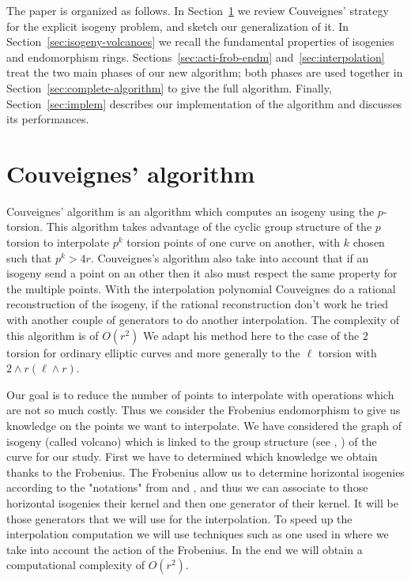\documentclass{lms}
\begin{document}
The paper is organized as follows. In Section~\ref{sec:couv-algor} we
review Couveignes' strategy for the explicit isogeny problem, and
sketch our generalization of it. In
Section~\ref{sec:isogeny-volcanoes} we recall the fundamental
properties of isogenies and endomorphism
rings. Sections~\ref{sec:acti-frob-endm} and~\ref{sec:interpolation}
treat the two main phases of our new algorithm; both phases are used
together in Section~\ref{sec:complete-algorithm} to give the full
algorithm. Finally, Section~\ref{sec:implem} describes our
implementation of the algorithm and discusses its performances.



\section{Couveignes' algorithm}
\label{sec:couv-algor}


Couveignes' algorithm \cite{couveignes96} is an algorithm which computes an isogeny using the $p$-torsion. This algorithm takes advantage of the cyclic group structure of the $p$ torsion to interpolate $p^k$ torsion points of one curve on another, with $k$ chosen such that $p^k>4r$. Couveignes's algorithm also take into account that if an isogeny send a point on an other then it also must respect the same property for the multiple points. With the interpolation polynomial Couveignes do a rational reconstruction of the isogeny, if the rational reconstruction don't work he tried with another couple of generators to do another interpolation. The complexity of this algorithm is of $O(r^2)$
\newline
We adapt his method here to the case of the $2$ torsion for ordinary elliptic curves and more generally to the $\ell$ torsion with $2 \wedge r ( \ell \wedge r)$.

Our goal is to reduce the number of points to interpolate with operations which are not so much costly. Thus we consider the Frobenius endomorphism to give us knowledge on the points we want to interpolate. We have considered the graph of isogeny (called volcano) which is linked to the group structure (see \cite{MiretMRV05}, \cite{IonicaJ10} ) of the curve for our study. First we have to determined which knowledge we obtain thanks to the Frobenius. The Frobenius allow us to determine horizontal isogenies according to the "notations" from \cite{Kohel} and \cite{volcano}, and thus we can associate to those horizontal isogenies their kernel and then one generator of their kernel. It will be those generators that we will use for the interpolation. To speed up the interpolation computation we will use techniques such as one used in \cite{enge+morain03} where we take into account the action of the Frobenius. In the end we will obtain a computational complexity of $O(r^2)$.
\end{document}
